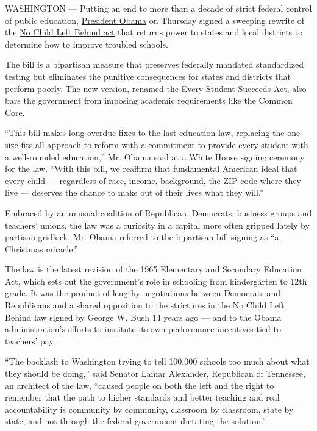 WASHINGTON --- Putting an end to more than a decade of strict federal
control of public education,
\href{http://topics.nytimes.com/top/reference/timestopics/people/o/barack_obama/index.html?inline=nyt-per}{President
Obama} on Thursday signed a sweeping rewrite of the
\href{http://topics.nytimes.com/top/reference/timestopics/subjects/n/no_child_left_behind_act/index.html?inline=nyt-classifier}{No
Child Left Behind act} that returns power to states and local districts
to determine how to improve troubled schools.

The bill is a bipartisan measure that preserves federally mandated
standardized testing but eliminates the punitive consequences for states
and districts that perform poorly. The new version, renamed the Every
Student Succeeds Act, also bars the government from imposing academic
requirements like the Common Core.

``This bill makes long-overdue fixes to the last education law,
replacing the one-size-fits-all approach to reform with a commitment to
provide every student with a well-rounded education,'' Mr. Obama said at
a White House signing ceremony for the law. ``With this bill, we
reaffirm that fundamental American ideal that every child --- regardless
of race, income, background, the ZIP code where they live --- deserves
the chance to make out of their lives what they will.''

Embraced by an unusual coalition of Republican, Democrats, business
groups and teachers' unions, the law was a curiosity in a capital more
often gripped lately by partisan gridlock. Mr. Obama referred to the
bipartisan bill-signing as ``a Christmas miracle.''

The law is the latest revision of the 1965 Elementary and Secondary
Education Act, which sets out the government's role in schooling from
kindergarten to 12th grade. It was the product of lengthy negotiations
between Democrats and Republicans and a shared opposition to the
strictures in the No Child Left Behind law signed by George W. Bush 14
years ago --- and to the Obama administration's efforts to institute its
own performance incentives tied to teachers' pay.

``The backlash to Washington trying to tell 100,000 schools too much
about what they should be doing,'' said Senator Lamar Alexander,
Republican of Tennessee, an architect of the law, ``caused people on
both the left and the right to remember that the path to higher
standards and better teaching and real accountability is community by
community, classroom by classroom, state by state, and not through the
federal government dictating the solution.''

